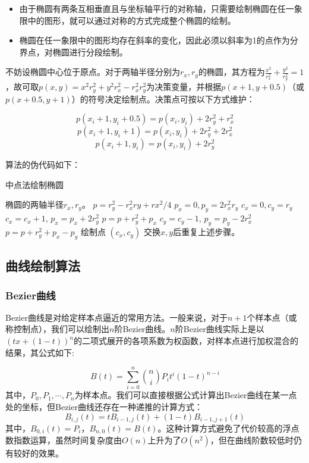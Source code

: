 \documentclass[a4paper,12pt]{article}
\begin{document}
\begin{itemize}
	\item 由于椭圆有两条互相垂直且与坐标轴平行的对称轴，只需要绘制椭圆在任一象限中的图形，就可以通过对称的方式完成整个椭圆的绘制。
	\item 椭圆在任一象限中的图形均存在斜率的变化，因此必须以斜率为1的点作为分界点，对椭圆进行分段绘制。
\end{itemize}
不妨设椭圆中心位于原点。对于两轴半径分别为$r_x,r_y$的椭圆，其方程为$\frac{x^2}{r_x^2} + \frac{y^2}{r_y^2} = 1$，故可取$p(x, y) = x^2r_y^2 + y^2 r_x^2 - r_x^2r_y^2$为决策变量，并根据$p(x+1, y+0.5)$（或$p(x+0.5, y+1)$）的符号决定绘制点。决策点可按以下方式维护：

$$ p(x_i+1, y_i+0.5) = p(x_i, y_i) + 2r_y^2 + r_x^2 $$
$$ p(x_i+1, y_i+1) = p(x_i, y_i) + 2r_y^2 + 2r_x^2 $$
$$ p(x_i+1, y_i) = p(x_i, y_i) + 2r_y^2 $$

算法的伪代码如下：

\begin{algorithm}[htb] 
	\caption{中点法绘制椭圆} 
	\label{alg:Midpoint} 
	\begin{algorithmic}[1] 
		\Require 
		椭圆的两轴半径$r_x, r_y$。
		\State $p = r_y^2 - r_x^2 ry + rx^2 / 4$
		\State $p_x = 0, p_y = 2r_x^2r_y$
		\State $c_x = 0, c_y = r_y$
		\State $c_x = c_x + 1$, $p_x = p_x + 2 r_y^2$ 
		\State $p = p + r_y^2 + p_x$
		\Else
		\State $c_y = c_y - 1$, $p_y = p_y - 2 r_x^2$
		\State $p = p + r_y^2 + p_x - p_y$
		\EndIf
		\State 绘制点 $(c_x, c_y)$
		\EndFor
		\State 交换$x, y$后重复上述步骤。
	\end{algorithmic} 
\end{algorithm}

\subsection{曲线绘制算法}
\subsubsection{Bezier曲线}
Bezier曲线\cite{wiki:Bezier}是对给定样本点逼近的常用方法。一般来说，对于$n+1$个样本点（或称控制点），我们可以绘制出$n$阶Bezier曲线。$n$阶Bezier曲线实际上是以$(tx+(1-t))^n$的二项式展开的各项系数为权函数，对样本点进行加权混合的结果，其公式如下:

$$ B(t) = \sum_{i=0}^n \binom{n}{i} P_i t^i (1-t)^{n-i} $$
其中，$P_0, P_1, \cdots, P_n$为样本点。我们可以直接根据公式计算出Bezier曲线在某一点处的坐标，但Bezier曲线还存在一种递推的计算方式：
$$ B_{i, j}(t) = t B_{i-1, j}(t) + (1-t) B_{i-1, j+1}(t) $$
其中，$B_{0, i}(t) = P_i$，$B_{n, 0}(t) = B(t)$。这种计算方式避免了代价较高的浮点数指数运算，虽然时间复杂度由$O(n)$上升为了$O(n^2)$，但在曲线阶数较低时仍有较好的效果。
\end{document}
